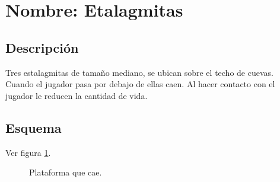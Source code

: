 \section{Nombre: Etalagmitas}\label{obs.rocas}
	\subsection{Descripción}
	Tres estalagmitas de tamaño mediano, se ubican sobre el techo de cuevas. Cuando el jugador pasa por debajo de ellas caen. Al hacer contacto con el jugador le reducen la cantidad de vida.
	\subsection{Esquema}
Ver figura \ref{fig:estalagmitas}.
	\begin{figure}
  \centering
  \caption{Plataforma que cae.}
  \label{fig:estalagmitas}
\end{figure} 
